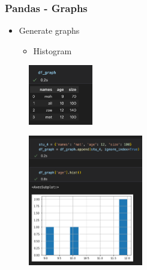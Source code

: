 \begin{frame}\frametitle{Pandas - Graphs}
   \begin{minipage}{0.58\linewidth}
      \begin{itemize}
         \item Generate graphs
         \begin{itemize}
            \item Histogram
         \end{itemize}
      \end{itemize}
      \vspace{.5cm}
      \begin{figure}[H]
         \includegraphics[width=2.8cm]{../images/illustrations/pandas_df_graph.png}
      \end{figure}
   \end{minipage}
   \begin{minipage}{0.38\linewidth}
      \begin{figure}[H]
         \includegraphics[width=5cm]{../images/illustrations/pandas_hist.png}
      \end{figure}
   \end{minipage}
\end{frame}




